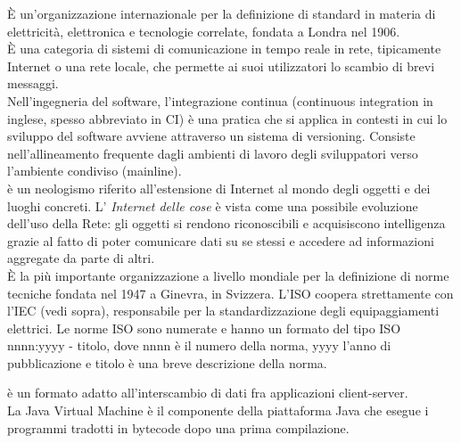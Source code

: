 \documentclass{scalatekids-article}
\begin{document}
 È un'organizzazione internazionale per la definizione di standard in materia di elettricità, elettronica e tecnologie correlate, fondata a Londra nel 1906.
\\

 È una categoria di sistemi di comunicazione in tempo reale in rete, tipicamente Internet o una rete locale, che permette ai suoi utilizzatori lo scambio di brevi messaggi.
\\

 Nell'ingegneria del software, l'integrazione continua (continuous integration in inglese, spesso abbreviato in CI) è una pratica che si applica in contesti in cui lo sviluppo del software avviene attraverso un sistema di versioning. Consiste nell'allineamento frequente dagli ambienti di lavoro degli sviluppatori verso l'ambiente condiviso (mainline).
\\

 è un neologismo riferito all'estensione di Internet al mondo degli oggetti e dei luoghi concreti.
L' \textit{Internet delle cose} è vista come una possibile evoluzione dell'uso della Rete: gli oggetti si rendono riconoscibili e acquisiscono intelligenza grazie al fatto di poter comunicare dati su se stessi e accedere ad informazioni aggregate da parte di altri.
\\

   È la più importante organizzazione a livello mondiale per la definizione di norme tecniche fondata nel 1947 a Ginevra, in Svizzera.
  L'ISO coopera strettamente con l'IEC (vedi sopra), responsabile per la standardizzazione degli equipaggiamenti elettrici.
  Le norme ISO sono numerate e hanno un formato del tipo ISO nnnn:yyyy - titolo, dove nnnn è il numero della norma, yyyy l'anno di pubblicazione e titolo è una breve descrizione della norma.
  \\


   è un formato adatto all'interscambio di dati fra applicazioni client-server.
  \\

   La Java Virtual Machine è il componente della piattaforma Java che esegue i programmi tradotti in bytecode dopo una prima compilazione.
  \\
\end{document}
